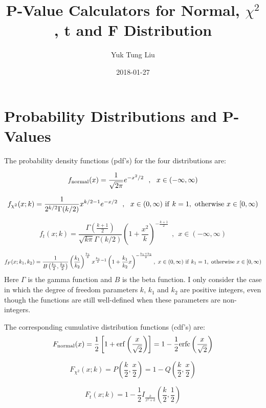 \documentclass[12pt]{article}
\newcommand \beq {\begin{equation}}
\newcommand \eeq {\end{equation}}
\begin{document}
\title{P-Value Calculators for Normal, $\chi^2$, t and F Distribution}
\author{Yuk Tung Liu}
\date{2018-01-27}
\maketitle

\section{Probability Distributions and P-Values}

The probability density functions (pdf's) for the four distributions are:

\beq
  f_{\rm normal}(x) = \frac{1}{\sqrt{2\pi}} e^{-x^2/2} \ \ , \ \  
x \in (-\infty,\infty) 
\label{eq:f_normal}
\eeq

\beq
  f_{\chi^2}(x; k) = \frac{1}{2^{k/2} \Gamma(k/2)} x^{k/2-1} e^{-x/2} \ \ , \ \ 
x \in (0,\infty)~{\rm if}~k=1,~{\rm otherwise}~x \in [0,\infty) 
\label{eq:f_chi2}
\eeq

\beq
  f_t(x;k) = \frac{\Gamma \left(\frac{k+1}{2}\right)}{\sqrt{k\pi} \Gamma(k/2)} 
\left( 1+\frac{x^2}{k}\right)^{-\frac{k+1}{2}} \ \ , \ \ x \in (-\infty,\infty) 
\label{eq:f_t}
\eeq

\beq
  f_F(x; k_1,k_2) = \frac{1}{B\left(\frac{k_1}{2},\frac{k_2}{2}\right)} 
\left( \frac{k_1}{k_2}\right)^{\frac{k_1}{2}} x^{\frac{k_1}{2}-1} 
\left(1+\frac{k_1}{k_2}x\right)^{-\frac{k_1+k_2}{2}} , \  
x \in (0,\infty)~{\rm if}~k_1=1,~{\rm otherwise}~x \in [0,\infty)
\label{eq:f_F}
\eeq
Here $\Gamma$ is the gamma function and $B$ is the beta function. 
I only consider the case in which 
the degree of freedom parameters $k$, $k_1$ and $k_2$ are positive integers, 
even though the functions are still well-defined when these parameters are 
non-integers.

The corresponding cumulative distribution functions (cdf's) are:
\beq
   F_{\rm normal}(x) = \frac{1}{2} \left[ 1+{\rm erf}\left(\frac{x}{\sqrt{2}}\right) 
\right] = 1-\frac{1}{2}{\rm erfc}\left(\frac{x}{\sqrt{2}}\right) 
\label{eq:F_normal} 
\eeq

\beq
  F_{\chi^2}(x;k) = P\left(\frac{k}{2},\frac{x}{2}\right) = 
1-Q\left(\frac{k}{2},\frac{x}{2}\right)
\label{eq:F_chi2}
\eeq

\beq
 F_t(x;k) = 1-\frac{1}{2}I_{\frac{k}{x^2+k}}\left( \frac{k}{2},\frac{1}{2}\right) 
\label{eq:F_t}
\eeq
\end{document}
